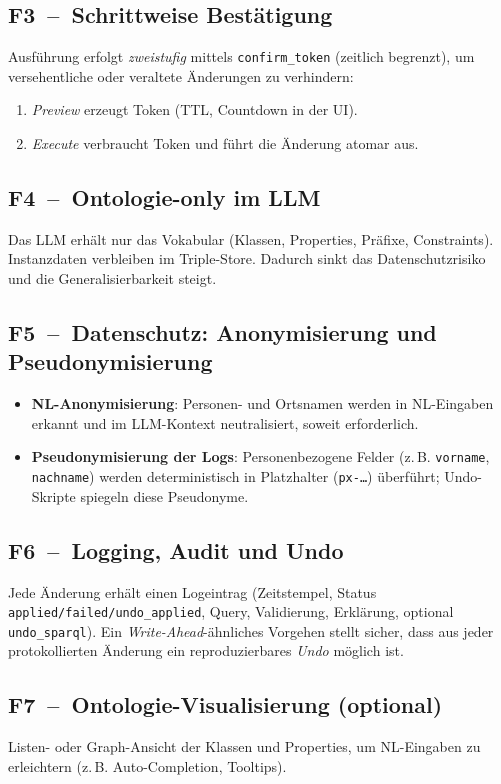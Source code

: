 \subsection*{F3~–~Schrittweise Bestätigung}
Ausführung erfolgt \emph{zweistufig} mittels \texttt{confirm\_token} (zeitlich begrenzt), um versehentliche oder veraltete Änderungen zu verhindern:
\begin{enumerate}
  \item \emph{Preview} erzeugt Token (TTL, Countdown in der UI).
  \item \emph{Execute} verbraucht Token und führt die Änderung atomar aus.
\end{enumerate}

\subsection*{F4~–~Ontologie-only im LLM}
Das LLM erhält nur das Vokabular (Klassen, Properties, Präfixe, Constraints). Instanzdaten verbleiben im Triple-Store. Dadurch sinkt das Datenschutzrisiko und die Generalisierbarkeit steigt.

\subsection*{F5~–~Datenschutz: Anonymisierung und Pseudonymisierung}
\begin{itemize}
  \item \textbf{NL-Anonymisierung}: Personen- und Ortsnamen werden in NL-Eingaben erkannt und im LLM-Kontext neutralisiert, soweit erforderlich.
  \item \textbf{Pseudonymisierung der Logs}: Personenbezogene Felder (z.\,B. \texttt{vorname}, \texttt{nachname}) werden deterministisch in Platzhalter (\texttt{px-\ldots}) überführt; Undo-Skripte spiegeln diese Pseudonyme.
\end{itemize}

\subsection*{F6~–~Logging, Audit und Undo}
Jede Änderung erhält einen Logeintrag (Zeitstempel, Status \texttt{applied/failed/undo\_applied}, Query, Validierung, Erklärung, optional \texttt{undo\_sparql}). Ein \emph{Write-Ahead}-ähnliches Vorgehen stellt sicher, dass aus jeder protokollierten Änderung ein reproduzierbares \emph{Undo} möglich ist.

\subsection*{F7~–~Ontologie-Visualisierung (optional)}
Listen- oder Graph-Ansicht der Klassen und Properties, um NL-Eingaben zu erleichtern (z.\,B. Auto-Completion, Tooltips).

